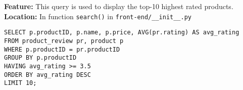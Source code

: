 \textbf{Feature:} This query is used to display the top-10 highest rated products. \\
\textbf{Location:} In function \texttt{search()} in \texttt{front-end/\_\_init\_\_.py}

\begin{lstlisting}
SELECT p.productID, p.name, p.price, AVG(pr.rating) AS avg_rating
FROM product_review pr, product p
WHERE p.productID = pr.productID
GROUP BY p.productID
HAVING avg_rating >= 3.5
ORDER BY avg_rating DESC
LIMIT 10;
\end{lstlisting}